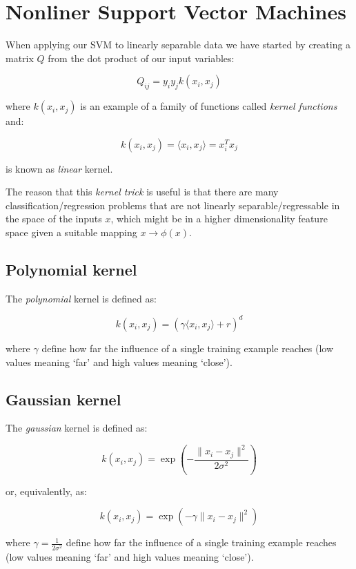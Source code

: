 \section{Nonliner Support Vector Machines}

When applying our SVM to linearly separable data we have started by creating a matrix $Q$ from the dot product of our input variables:

\begin{equation}
	Q_{ij}=y_i y_j k(x_i,x_j) \tag{3.1}
\end{equation}

where $k(x_i,x_j)$ is an example of a family of functions called \emph{kernel functions} and:  

\begin{equation}
	k(x_i,x_j)=\langle x_i, x_j \rangle= x_i^T x_j \tag{3.2}
\end{equation}

is known as \emph{linear} kernel.

The reason that this \emph{kernel trick} is useful is that there are many classification/regression problems that are not linearly separable/regressable in the space of the inputs $x$, which might be in a higher dimensionality feature space given a suitable mapping $x \rightarrow \phi(x)$.

\subsection{Polynomial kernel}

The \emph{polynomial} kernel is defined as:

\begin{equation}
	k(x_i,x_j)=(\gamma \langle x_i, x_j\rangle + r)^d \tag{3.3}
\end{equation}

where $\gamma$ define how far the influence of a single training example reaches (low values meaning ‘far’ and high values meaning ‘close’).

\subsection{Gaussian kernel}

The \emph{gaussian} kernel is defined as:

\begin{equation}
	k(x_i,x_j)=\exp(-\frac{\|x_i-x_j\|^2}{2\sigma^2}) \tag{3.4a}
\end{equation}

or, equivalently, as:

\begin{equation}
	k(x_i,x_j)=\exp(-\gamma \|x_i-x_j\|^2) \tag{3.4b}
\end{equation}

where $\displaystyle \gamma=\frac{1}{2\sigma^2}$ define how far the influence of a single training example reaches (low values meaning ‘far’ and high values meaning ‘close’).